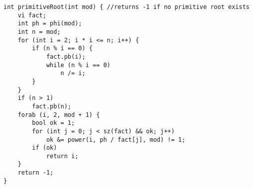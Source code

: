 \begin{verbatim}
int primitiveRoot(int mod) { //returns -1 if no primitive root exists
	vi fact;
	int ph = phi(mod);
	int n = mod;
	for (int i = 2; i * i <= n; i++) {
		if (n % i == 0) {
			fact.pb(i);
			while (n % i == 0)
				n /= i;
		}
	}
	if (n > 1)
		fact.pb(n);
	forab (i, 2, mod + 1) {
		bool ok = 1;
		for (int j = 0; j < sz(fact) && ok; j++)
			ok &= power(i, ph / fact[j], mod) != 1;
		if (ok)
			return i;
	}
	return -1;
}
\end{verbatim}
